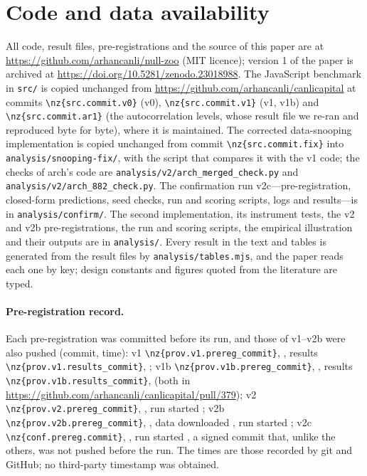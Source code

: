 \section*{Code and data availability}
All code, result files, pre-registrations and the source of this paper are at \url{https://github.com/arhancanli/null-zoo} (MIT licence); version 1 of the paper is archived at \url{https://doi.org/10.5281/zenodo.23018988}. The JavaScript benchmark in \nolinkurl{src/} is copied unchanged from \url{https://github.com/arhancanli/canlicapital} at commits \nolinkurl{\nz{src.commit.v0}} (v0), \nolinkurl{\nz{src.commit.v1}} (v1, v1b) and \nolinkurl{\nz{src.commit.ar1}} (the autocorrelation levels, whose result file we re-ran and reproduced byte for byte), where it is maintained. The corrected data-snooping implementation is copied unchanged from commit \nolinkurl{\nz{src.commit.fix}} into \nolinkurl{analysis/snooping-fix/}, with the script that compares it with the v1 code; the checks of arch's code are \nolinkurl{analysis/v2/arch_merged_check.py} and \nolinkurl{analysis/v2/arch_882_check.py}. The confirmation run v2c---pre-registration, closed-form predictions, seed checks, run and scoring scripts, logs and results---is in \nolinkurl{analysis/confirm/}. The second implementation, its instrument tests, the v2 and v2b pre-registrations, the run and scoring scripts, the empirical illustration and their outputs are in \nolinkurl{analysis/}. Every result in the text and tables is generated from the result files by \nolinkurl{analysis/tables.mjs}, and the paper reads each one by key; design constants and figures quoted from the literature are typed.

\paragraph{Pre-registration record.} Each pre-registration was committed before its run, and those of v1--v2b were also pushed (commit, time): v1 \nolinkurl{\nz{prov.v1.prereg_commit}}, , results \nolinkurl{\nz{prov.v1.results_commit}}, ; v1b \nolinkurl{\nz{prov.v1b.prereg_commit}}, , results \nolinkurl{\nz{prov.v1b.results_commit}},  (both in \url{https://github.com/arhancanli/canlicapital/pull/379}); v2 \nolinkurl{\nz{prov.v2.prereg_commit}}, , run started ; v2b \nolinkurl{\nz{prov.v2b.prereg_commit}}, , data downloaded , run started ; v2c \nolinkurl{\nz{conf.prereg.commit}}, , run started , a signed commit that, unlike the others, was not pushed before the run. The times are those recorded by git and GitHub; no third-party timestamp was obtained.

